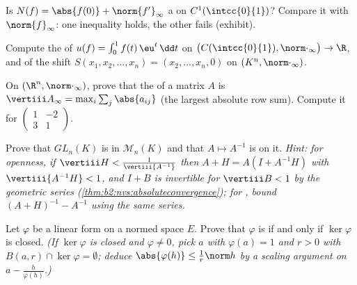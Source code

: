 \begin{exercise}[$\star$]\label{exo:b2:nvs:2}
Is $N(f) = \abs{f(0)} + \norm{f'}_\infty$ a  on
$C^1(\intcc{0}{1})$? Compare it with $\norm{f}_\infty$: one
inequality holds, the other fails (exhibit).
\end{exercise}

\begin{exercise}[$\star$]\label{exo:b2:nvs:3}
Compute the  of $u(f) = \int_0^1 f(t)\,\eu^t\,\dd t$
on $\bigl(C(\intcc{0}{1}), \norm\cdot_\infty\bigr) \to \R$, and of
the shift $S(x_1, x_2, \dots, x_n) = (x_2, \dots, x_n, 0)$ on
$(K^n, \norm\cdot_\infty)$.
\end{exercise}

\begin{exercise}[$\star\star$]\label{exo:b2:nvs:4}
On $(\R^n, \norm\cdot_\infty)$, prove that the  of a
matrix $A$ is $\vertiii A_\infty = \max_i \sum_j \abs{a_{ij}}$ (the
largest absolute row sum). Compute it for $\begin{pmatrix} 1 & -2\\
3 & 1\end{pmatrix}$.
\end{exercise}

\begin{exercise}[$\star\star$]\label{exo:b2:nvs:5}
Prove that $GL_n(K)$ is  in $\mathcal{M}_n(K)$ and that $A
\mapsto A^{-1}$ is  on it. \emph{Hint: for openness, if
$\vertiii H < \frac{1}{\vertiii{A^{-1}}}$ then $A + H = A(I +
A^{-1}H)$ with $\vertiii{A^{-1}H} < 1$, and $I + B$ is invertible
for $\vertiii B < 1$ by the geometric series
(\cref{thm:b2:nvs:absoluteconvergence}); for , bound
$(A+H)^{-1} - A^{-1}$ using the same series.}
\end{exercise}

\begin{exercise}[$\star\star$]\label{exo:b2:nvs:6}
Let $\varphi$ be a linear form on a normed space $E$. Prove that
$\varphi$ is  if and only if $\ker\varphi$ is closed.
\emph{(If $\ker\varphi$ is closed and $\varphi \neq 0$, pick $a$
with $\varphi(a) = 1$ and $r > 0$ with $B(a, r) \cap \ker\varphi =
\emptyset$; deduce $\abs{\varphi(h)} \leq \frac{1}{r}\norm h$ by a
scaling argument on $a - \frac{h}{\varphi(h)}$.)}
\end{exercise}

